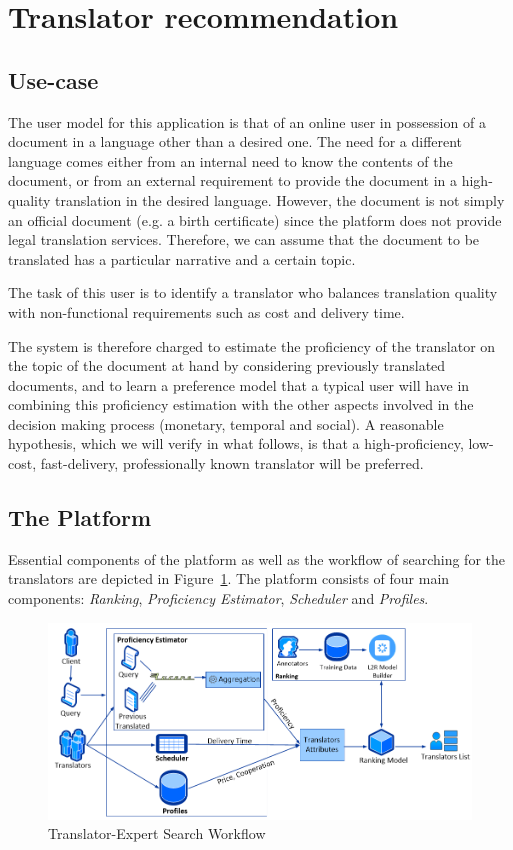 \section{Translator recommendation}
\label{sec:casestudy}
\subsection{Use-case}\label{sec:usecase}
The user model for this application is that of an online user in possession of a document in a language other than a desired one. The need for a different language comes either from an internal need to know the contents of the document, or from an external requirement to provide the document in a high-quality translation in the desired language. However, the document is not simply an official document (e.g. a birth certificate) since the platform does not provide legal translation services. Therefore, we can assume that the document to be translated has a particular narrative and a certain topic. 

The task of this user is to identify a translator who balances translation quality with non-functional requirements such as cost and delivery time.  

The system is therefore charged to estimate the proficiency of the translator on the topic of the document at hand by considering previously translated documents, and to learn a preference model that a typical user will have in combining this proficiency estimation with the other aspects involved in the decision making process (monetary, temporal and social). A reasonable hypothesis, which we will verify in what follows, is that a high-proficiency, low-cost, fast-delivery, professionally known translator will be preferred. 

\subsection{The Platform}\label{sec:platform}
Essential components of the platform as well as the workflow of searching for the translators are depicted in Figure~\ref{fig:architecture}. The platform consists of four main components: \textit{Ranking}, \textit{Proficiency Estimator}, \textit{Scheduler} and \textit{Profiles}.

\begin{figure}
\begin{center}
\includegraphics[width=12cm]{figures/dataflow.png}
\caption{Translator-Expert Search Workflow
\label{fig:architecture}}
\end{center}
\end{figure}

